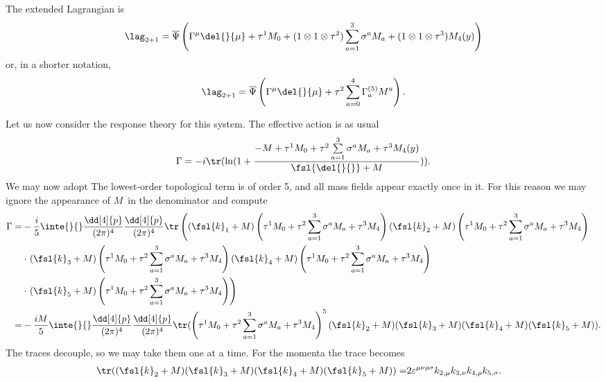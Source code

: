 The extended Lagrangian is
\begin{align*}
	\lag_{2 + 1} = \overline{\Psi}\left(\Gamma^{\mu}\del{}{\mu} + \tau^{1}M_{0} + (1\otimes 1\otimes\tau^{2})\sum\limits_{a = 1}^{3}\sigma^{a}M_{a} + (1\otimes 1\otimes\tau^{3})M_{4}(y)\right)
\end{align*}
or, in a shorter notation,
\begin{align*}
	\lag_{2 + 1} = \overline{\Psi}\left(\Gamma^{\mu}\del{}{\mu} + \tau^{2}\sum\limits_{a = 0}^{4}\Gamma_{a}^{(5)}M^{a}\right).
\end{align*}

Let us now consider the response theory for this system. The effective action is as usual
\begin{align*}
	\Gamma = -i\tr(\ln(1 + \frac{-M + \tau^{1}M_{0} + \tau^{2}\sum\limits_{a = 1}^{3}\sigma^{a}M_{a} + \tau^{3}M_{4}(y)}{\fsl{\del{}{}} + M})).
\end{align*}
We may now adopt
The lowest-order topological term is of order 5, and all mass fields appear exactly once in it. For this reason we may ignore the appearance of $M$ in the denominator and compute
\begin{align*}
	\Gamma =& -\frac{i}{5}\inte{}{}\frac{\dd[4]{p}}{(2\pi)^{4}}\frac{\dd[4]{p}}{(2\pi)^{4}}\tr\left((\fsl{k}_{1} + M)\left(\tau^{1}M_{0} + \tau^{2}\sum\limits_{a = 1}^{3}\sigma^{a}M_{a} + \tau^{3}M_{4}\right)(\fsl{k}_{2} + M)\left(\tau^{1}M_{0} + \tau^{2}\sum\limits_{a = 1}^{3}\sigma^{a}M_{a} + \tau^{3}M_{4}\right) \right. \\
	&\cdot\left. (\fsl{k}_{3} + M)\left(\tau^{1}M_{0} + \tau^{2}\sum\limits_{a = 1}^{3}\sigma^{a}M_{a} + \tau^{3}M_{4}\right)(\fsl{k}_{4} + M)\left(\tau^{1}M_{0} + \tau^{2}\sum\limits_{a = 1}^{3}\sigma^{a}M_{a} + \tau^{3}M_{4}\right) \right. \\
	&\cdot\left. (\fsl{k}_{5 } + M)\left(\tau^{1}M_{0} + \tau^{2}\sum\limits_{a = 1}^{3}\sigma^{a}M_{a} + \tau^{3}M_{4}\right)\right) \\
	=& -\frac{iM}{5}\inte{}{}\frac{\dd[4]{p}}{(2\pi)^{4}}\frac{\dd[4]{p}}{(2\pi)^{4}}\tr(\left(\tau^{1}M_{0} + \tau^{2}\sum\limits_{a = 1}^{3}\sigma^{a}M_{a} + \tau^{3}M_{4}\right)^{5}(\fsl{k}_{2} + M)(\fsl{k}_{3} + M)(\fsl{k}_{4} + M)(\fsl{k}_{5 } + M)).
\end{align*}
The traces decouple, so we may take them one at a time. For the momenta the trace becomes
\begin{align*}
	\tr((\fsl{k}_{2} + M)(\fsl{k}_{3} + M)(\fsl{k}_{4} + M)(\fsl{k}_{5 } + M)) =& 2\varepsilon^{\mu\nu\rho\sigma}k_{2, \mu}k_{3, \nu}k_{4, \rho}k_{5, \sigma}.
\end{align*}
